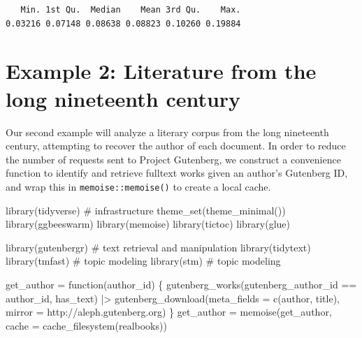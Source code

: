 \documentclass[
]{article}
\newenvironment{Shaded}{\begin{snugshade}}{\end{snugshade}}
\newcommand{\AttributeTok}[1]{\textcolor[rgb]{0.40,0.45,0.13}{#1}}
\newcommand{\CommentTok}[1]{\textcolor[rgb]{0.37,0.37,0.37}{#1}}
\newcommand{\ControlFlowTok}[1]{\textcolor[rgb]{0.00,0.23,0.31}{#1}}
\newcommand{\FunctionTok}[1]{\textcolor[rgb]{0.28,0.35,0.67}{#1}}
\newcommand{\NormalTok}[1]{\textcolor[rgb]{0.00,0.23,0.31}{#1}}
\newcommand{\OtherTok}[1]{\textcolor[rgb]{0.00,0.23,0.31}{#1}}
\newcommand{\SpecialCharTok}[1]{\textcolor[rgb]{0.37,0.37,0.37}{#1}}
\newcommand{\StringTok}[1]{\textcolor[rgb]{0.13,0.47,0.30}{#1}}
\begin{document}
\begin{verbatim}
   Min. 1st Qu.  Median    Mean 3rd Qu.    Max. 
0.03216 0.07148 0.08638 0.08823 0.10260 0.19884 
\end{verbatim}

\hypertarget{sec-realbooks}{%
\section{Example 2: Literature from the long nineteenth
century}\label{sec-realbooks}}

Our second example will analyze a literary corpus from the long
nineteenth century, attempting to recover the author of each document.
In order to reduce the number of requests sent to Project Gutenberg, we
construct a convenience function to identify and retrieve fulltext works
given an author's Gutenberg ID, and wrap this in
\texttt{memoise::memoise()} to create a local cache.

\begin{Shaded}
\begin{Highlighting}[]
\FunctionTok{library}\NormalTok{(tidyverse)            }\CommentTok{\# infrastructure}
\FunctionTok{theme\_set}\NormalTok{(}\FunctionTok{theme\_minimal}\NormalTok{())}
\FunctionTok{library}\NormalTok{(ggbeeswarm)}
\FunctionTok{library}\NormalTok{(memoise)}
\FunctionTok{library}\NormalTok{(tictoc)}
\FunctionTok{library}\NormalTok{(glue)}

\FunctionTok{library}\NormalTok{(gutenbergr)           }\CommentTok{\# text retrieval and manipulation}
\FunctionTok{library}\NormalTok{(tidytext)}
\FunctionTok{library}\NormalTok{(tmfast)               }\CommentTok{\# topic modeling}
\FunctionTok{library}\NormalTok{(stm)                  }\CommentTok{\# topic modeling}

\NormalTok{get\_author }\OtherTok{=} \ControlFlowTok{function}\NormalTok{(author\_id) \{}
    \FunctionTok{gutenberg\_works}\NormalTok{(gutenberg\_author\_id }\SpecialCharTok{==}\NormalTok{ author\_id, }
\NormalTok{                    has\_text) }\SpecialCharTok{|\textgreater{}} 
        \FunctionTok{gutenberg\_download}\NormalTok{(}\AttributeTok{meta\_fields =} \FunctionTok{c}\NormalTok{(}\StringTok{\textquotesingle{}author\textquotesingle{}}\NormalTok{, }\StringTok{\textquotesingle{}title\textquotesingle{}}\NormalTok{), }
                           \AttributeTok{mirror =} \StringTok{\textquotesingle{}http://aleph.gutenberg.org\textquotesingle{}}\NormalTok{)}
\NormalTok{\}}
\NormalTok{get\_author }\OtherTok{=} \FunctionTok{memoise}\NormalTok{(get\_author, }
                     \AttributeTok{cache =} \FunctionTok{cache\_filesystem}\NormalTok{(}\StringTok{\textquotesingle{}realbooks\textquotesingle{}}\NormalTok{))}
\end{Highlighting}
\end{Shaded}
\end{document}

